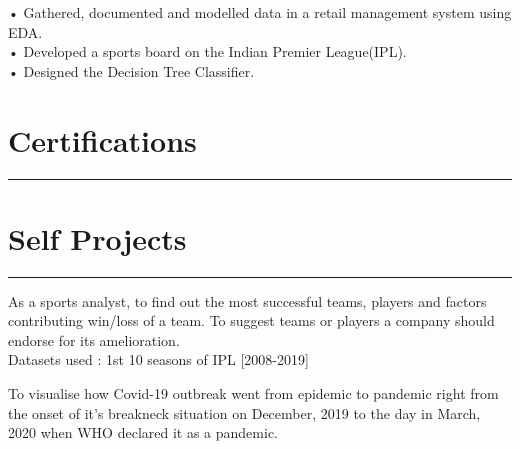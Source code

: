 \documentclass[]{rahulworld-resume}
\begin{document}
\begin{minipage}[t]{0.66\textwidth}
 
\noindent
\hspace{5em}%
\begin{minipage}{0.85\textwidth\vspace{2pt}}
• Gathered, documented and modelled data in a retail management system using EDA.\\
• Developed a sports board on the Indian Premier League(IPL).\\
• Designed the Decision Tree Classifier.
\end{minipage}
\section{Certifications} 
\noindent\rule{12.5cm}{0.4pt}
 
\noindent
\hspace{5em}%
 
\noindent
\hspace{5em}%
\hspace{5em}%
 
\noindent
\hspace{5em}%
\section{Self Projects}
\noindent\rule{12.5cm}{0.4pt}
 
\noindent
\hspace{5em}%
\begin{minipage}{0.85\textwidth\vspace{5pt}}
As a sports analyst, to find out the most successful teams, players and factors contributing win/loss of a team. To suggest teams or players a company should endorse for its amelioration.\\
Datasets used : 1st 10 seasons of IPL [2008-2019]
\end{minipage}
 
\noindent
\hspace{5em}%
\begin{minipage}{0.85\textwidth\vspace{5pt}}
To visualise how Covid-19 outbreak went from epidemic to pandemic right from the onset of it's breakneck situation on December, 2019 to the day in March, 2020 when WHO declared it as a pandemic.
\end{minipage}
\end{minipage} 
\end{document}
